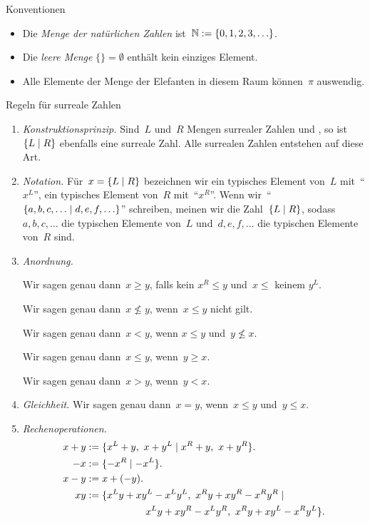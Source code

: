 \documentclass{zirkelblatt}
\begin{document}

\begin{block}{Konventionen}
\begin{itemize}
\item[]
Die \emph{Menge der natürlichen Zahlen} ist~$\mathbb{N} := \{ 0, 1, 2, 3, \ldots \}$.
\item[]
Die \emph{leere Menge} $\{ \} = \emptyset$ enthält kein einziges Element.
\item[]
Alle Elemente der Menge der Elefanten in diesem Raum können~$\pi$ auswendig.
\end{itemize}
\end{block}

\begin{block}{Regeln für surreale Zahlen}
\renewcommand{\labelenumi}{\arabic{enumi}.}
\begin{enumerate}
\item \emph{Konstruktionsprinzip.}
Sind~$L$ und~$R$ Mengen surrealer Zahlen und , so ist~$\{ L \mathrel{|} R \}$ ebenfalls eine surreale
Zahl. Alle surrealen Zahlen entstehen auf diese Art.

\item \emph{Notation.}
Für~$x = \{ L \mathrel{|} R \}$ bezeichnen wir ein typisches Element von~$L$
mit~"`$x^L$"', ein typisches Element von~$R$ mit~"`$x^R$"'. Wenn
wir~"`$\{ a,b,c,\ldots \mathrel{|} d,e,f,\ldots \}$"' schreiben, meinen wir die
Zahl~$\{ L \mathrel{|} R \}$, sodass~$a,b,c,\ldots$ die typischen Elemente von~$L$
und~$d,e,f,\ldots$ die typischen Elemente von~$R$ sind.

\item \emph{Anordnung.}

Wir sagen genau dann~$x \geq y$, falls kein $x^R \leq y$ und~$x \leq$
keinem $y^L$.

Wir sagen genau dann~$x \not\leq y$, wenn~$x \leq y$ nicht gilt.

Wir sagen genau dann~$x < y$, wenn $x \leq y$ und~$y \not\leq x$.

Wir sagen genau dann~$x \leq y$, wenn~$y \geq x$.

Wir sagen genau dann~$x > y$, wenn~$y < x$.

\item \emph{Gleichheit.}
Wir sagen genau dann~$x = y$, wenn~$x \leq y$ und~$y \leq x$.

\item \emph{Rechenoperationen.}
\begin{align*}
  x + y &:= \{ x^L + y,\ x + y^L \mathrel{|} x^R + y,\ x + y^R \}. \\
  -x &:= \{ -x^R \mathrel{|} -x^L \}. \\
  x - y &:= x + (-y). \\
  xy &:= \{ x^Ly + xy^L - x^Ly^L,\ x^Ry + xy^R - x^Ry^R \mathrel{|} \\&\qquad\qquad\qquad x^Ly + xy^R -
x^Ly^R,\ x^Ry + xy^L - x^Ry^L \}.
\end{align*}
\end{enumerate}
\end{block}
\end{document}
